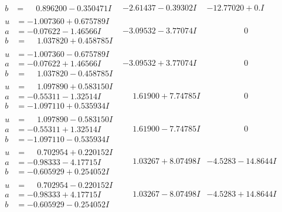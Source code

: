 \documentclass[1p]{elsarticle_modified}
\theoremstyle{definition}
\begin{document}
$$\begin{array}{c|c|c}
\begin{aligned}
b &= \phantom{-}0.896200 - 0.350471 I\end{aligned}
 & -2.61437 - 0.39302 I & -12.77020 + 0. I\phantom{ +0.000000I} \\ \hline\begin{aligned}
u &= -1.007360 + 0.675789 I \\
a &= -0.07622 - 1.46566 I \\
b &= \phantom{-}1.037820 + 0.458785 I\end{aligned}
 & -3.09532 - 3.77074 I & \phantom{-0.000000 } 0 \\ \hline\begin{aligned}
u &= -1.007360 - 0.675789 I \\
a &= -0.07622 + 1.46566 I \\
b &= \phantom{-}1.037820 - 0.458785 I\end{aligned}
 & -3.09532 + 3.77074 I & \phantom{-0.000000 } 0 \\ \hline\begin{aligned}
u &= \phantom{-}1.097890 + 0.583150 I \\
a &= -0.55311 - 1.32514 I \\
b &= -1.097110 + 0.535934 I\end{aligned}
 & \phantom{-}1.61900 + 7.74785 I & \phantom{-0.000000 } 0 \\ \hline\begin{aligned}
u &= \phantom{-}1.097890 - 0.583150 I \\
a &= -0.55311 + 1.32514 I \\
b &= -1.097110 - 0.535934 I\end{aligned}
 & \phantom{-}1.61900 - 7.74785 I & \phantom{-0.000000 } 0 \\ \hline\begin{aligned}
u &= \phantom{-}0.702954 + 0.220152 I \\
a &= -0.98333 - 4.17715 I \\
b &= -0.605929 + 0.254052 I\end{aligned}
 & \phantom{-}1.03267 + 8.07498 I & -4.5283 - 14.8644 I \\ \hline\begin{aligned}
u &= \phantom{-}0.702954 - 0.220152 I \\
a &= -0.98333 + 4.17715 I \\
b &= -0.605929 - 0.254052 I\end{aligned}
 & \phantom{-}1.03267 - 8.07498 I & -4.5283 + 14.8644 I \\ \hline\begin{aligned}

\end{aligned}
\end{array}$$
\end{document}

